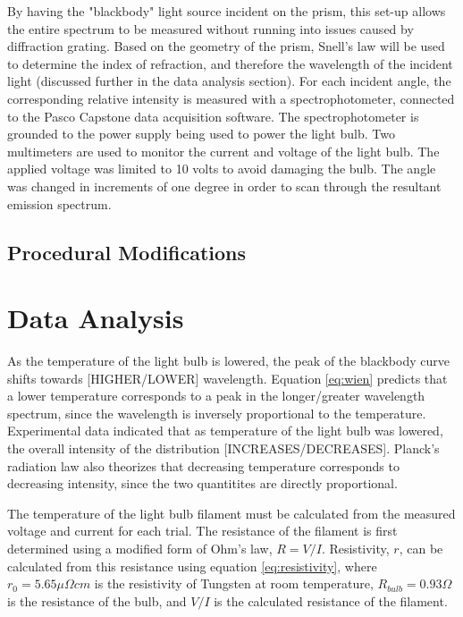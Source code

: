 \documentclass[a4paper]{article}
\begin{document}
\qq By having the "blackbody" light source incident on the prism, this set-up allows the entire spectrum to be measured without running into issues caused by diffraction grating. Based on the geometry of the prism, Snell's law will be used to determine the index of refraction, and therefore the wavelength of the incident light (discussed further in the data analysis section). For each incident angle, the corresponding relative intensity is measured with a spectrophotometer, connected to the Pasco Capstone data acquisition software. The spectrophotometer is grounded to the power supply being used to power the light bulb. Two multimeters are used to monitor the current and voltage of the light bulb. The applied voltage was limited to 10 volts to avoid damaging the bulb. The angle was changed in increments of one degree in order to scan through the resultant emission spectrum.

\subsection{Procedural Modifications}
\qq 

\section{Data Analysis}

\qq As the temperature of the light bulb is lowered, the peak of the blackbody curve shifts towards [HIGHER/LOWER] wavelength. Equation \ref{eq:wien} predicts that a lower temperature corresponds to a peak in the longer/greater wavelength spectrum, since the wavelength is inversely proportional to the temperature. Experimental data indicated that as temperature of the light bulb was lowered, the overall intensity of the distribution [INCREASES/DECREASES]. Planck's radiation law also theorizes that decreasing temperature corresponds to decreasing intensity, since the two quantitites are directly proportional.

\qq The temperature of the light bulb filament must be calculated from the measured voltage and current for each trial. The resistance of the filament is first determined using a modified form of Ohm's law, $R=V/I$. Resistivity, $r$, can be calculated from this resistance using equation \ref{eq:resistivity}, where $r_0 = 5.65 \mu \Omega cm$ is the resistivity of Tungsten at room temperature, $R_{bulb}=0.93 \Omega$ is the resistance of the bulb, and $V/I$ is the calculated resistance of the filament. 
\end{document}
